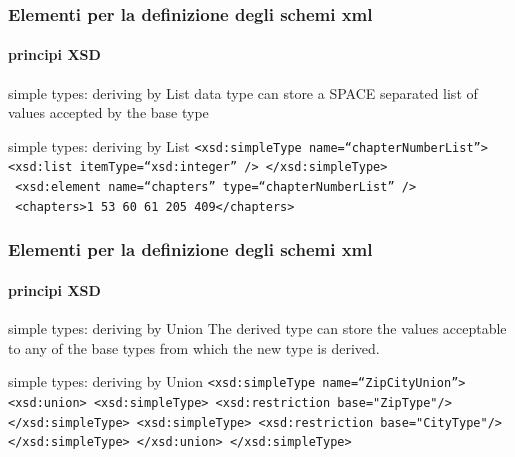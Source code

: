 \begin{frame}
	\frametitle{Elementi per la definizione degli schemi xml}
	\framesubtitle{principi XSD}
	\addtocounter{nframe}{1}

	\begin{block}{simple types: deriving by List}
		data type can store a SPACE separated list of values accepted by the base type
	\end{block}

	\begin{block}{simple types: deriving by List}
		\texttt{<xsd:simpleType name=``chapterNumberList''>
			<xsd:list itemType=``xsd:integer'' />
			</xsd:simpleType>}
		\\\texttt{
			<xsd:element name=``chapters'' type=``chapterNumberList'' />}
		\\\texttt{
			<chapters>1 53 60 61 205 409</chapters>}
	\end{block}

\end{frame}

\begin{frame}
	\frametitle{Elementi per la definizione degli schemi xml}
	\framesubtitle{principi XSD}
	\addtocounter{nframe}{1}

	\begin{block}{simple types: deriving by Union}
		The derived type can store the values acceptable to any of the base types from which the new type is derived.
	\end{block}

	\begin{block}{simple types: deriving by Union}
		\texttt{<xsd:simpleType name=``ZipCityUnion''>
		  <xsd:union>
		    <xsd:simpleType>
		      <xsd:restriction base="ZipType"/>
		    </xsd:simpleType>
		    <xsd:simpleType>
		      <xsd:restriction base="CityType"/>
		    </xsd:simpleType>
		  </xsd:union>
		 </xsd:simpleType>}
		
	\end{block}

\end{frame}





